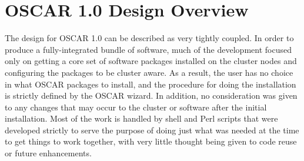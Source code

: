 %
%
%

\section{OSCAR 1.0 Design Overview}

The design for OSCAR 1.0 can be described as very tightly coupled. In
order to produce a fully-integrated bundle of software, much of the
development focused only on getting a core set of software packages
installed on the cluster nodes and configuring the packages to be
cluster aware. As a result, the user has no choice in what OSCAR
packages to install, and the procedure for doing the installation is
strictly defined by the OSCAR wizard. In addition, no consideration
was given to any changes that may occur to the cluster or software
after the initial installation. Most of the work is handled by shell
and Perl scripts that were developed strictly to serve the purpose of
doing just what was needed at the time to get things to work together,
with very little thought being given to code reuse or future
enhancements.
